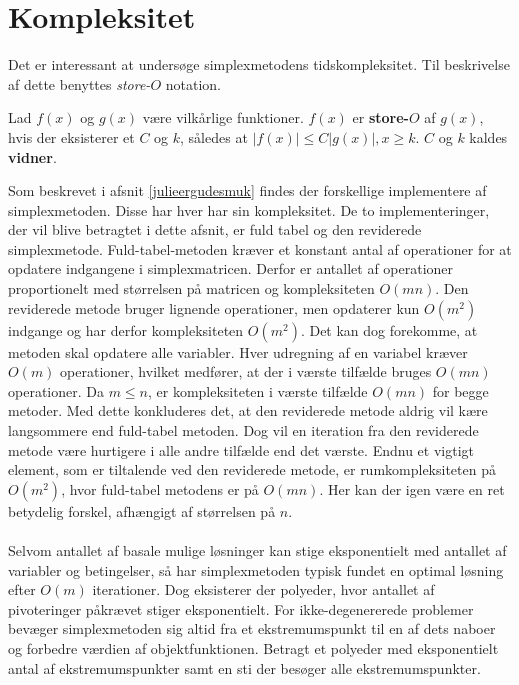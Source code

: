 \section{Kompleksitet}
\label{kompleksitet}
Det er interessant at undersøge simplexmetodens tidskompleksitet.
Til beskrivelse af dette benyttes \textit{store-$O$} notation.
%
\begin{defn}{}{}
Lad $f(x)$ og $g(x)$ være vilkårlige funktioner. $f(x)$ er \textbf{store-$O$} af $g(x)$, hvis der eksisterer et $C$ og $k$, således at $|f(x)| \leq C|g(x)|, x \geq k$. $C$ og $k$ kaldes \textbf{vidner}.
\end{defn}
\noindent
%
Som beskrevet i afsnit \ref{julieergudesmuk} findes der forskellige implementere af simplexmetoden. Disse har  hver har sin kompleksitet.
De to implementeringer, der vil blive betragtet i dette afsnit, er fuld tabel og den reviderede simplexmetode.
%
Fuld-tabel-metoden kræver et konstant antal af operationer for at opdatere indgangene i simplexmatricen.
Derfor er antallet af operationer proportionelt med størrelsen på matricen og kompleksiteten $O(mn)$.
Den reviderede metode bruger lignende operationer, men opdaterer kun $O(m^2)$ indgange og har derfor kompleksiteten $O(m^2)$.
Det kan dog forekomme, at metoden skal opdatere alle variabler.
Hver udregning af en variabel kræver $O(m)$ operationer, hvilket medfører, at der i værste tilfælde bruges $O(mn)$ operationer.
Da $m \leq n$, er kompleksiteten i værste tilfælde $O(mn)$ for begge metoder.
Med dette konkluderes det, at den reviderede metode aldrig vil kære langsommere end fuld-tabel metoden.
Dog vil en iteration fra den reviderede metode være hurtigere i alle andre tilfælde end det værste.
Endnu et vigtigt element, som er tiltalende ved den reviderede metode, er rumkompleksiteten på $O(m^2)$, hvor fuld-tabel metodens er på $O(mn)$.
Her kan der igen være en ret betydelig forskel, afhængigt af størrelsen på $n$.
\\\\
%
Selvom antallet af basale mulige løsninger kan stige eksponentielt med antallet af variabler og betingelser, så har simplexmetoden typisk fundet en optimal løsning efter $O(m)$ iterationer.
Dog eksisterer der polyeder, hvor antallet af pivoteringer påkrævet stiger eksponentielt.
For ikke-degenererede problemer bevæger simplexmetoden sig altid fra et ekstremumspunkt til en af dets naboer og forbedre værdien af objektfunktionen.
Betragt et polyeder med eksponentielt antal af ekstremumspunkter samt en sti der besøger alle ekstremumspunkter.
